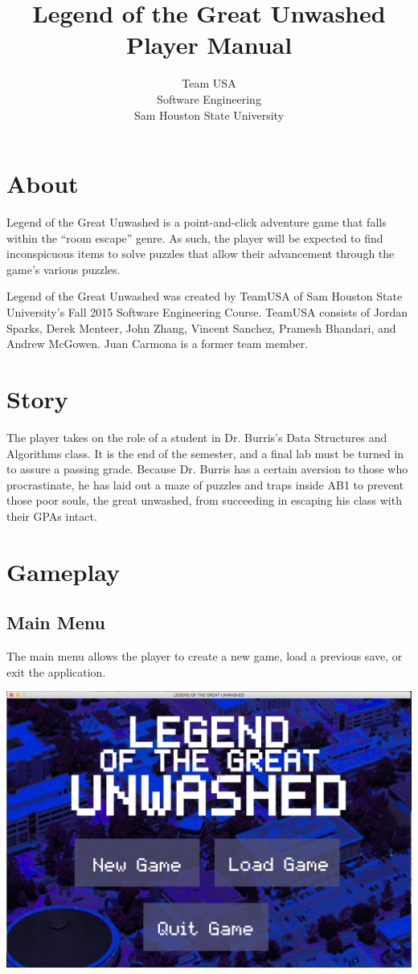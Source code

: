 \documentclass{article}
\title{Legend of the Great Unwashed \\ Player Manual}
\author{Team USA \\ Software Engineering \\ Sam Houston State University}
\begin{document}
%
%
\maketitle
\newpage
%
%
\tableofcontents
\newpage
%
%
\section{About}
	Legend of the Great Unwashed is a point-and-click adventure game that falls within the ``room escape'' genre. As such, the player will be expected to find inconspicuous items to solve puzzles that allow their advancement through the game's various puzzles. 
	
	Legend of the Great Unwashed was created by TeamUSA of Sam Houston State University's Fall 2015 Software Engineering Course. TeamUSA consists of Jordan Sparks, Derek Menteer, John Zhang, Vincent Sanchez, Pramesh Bhandari, and Andrew McGowen. Juan Carmona is a former team member. 
\section{Story}
	The player takes on the role of a student in Dr. Burris's Data Structures and Algorithms class. It is the end of the semester, and a final lab must be turned in to assure a passing grade. Because Dr. Burris has a certain aversion to those who procrastinate, he has laid out a maze of puzzles and traps inside AB1 to prevent those poor souls, the great unwashed, from succeeding in escaping his class with their GPAs intact. 
\section{Gameplay}
	\subsection{Main Menu}
		The main menu allows the player to create a new game, load a previous save, or exit the application.
		\begin{center}
			\includegraphics[scale=0.3]{UMimages/mainMenu}
		\end{center} 
\end{document}
